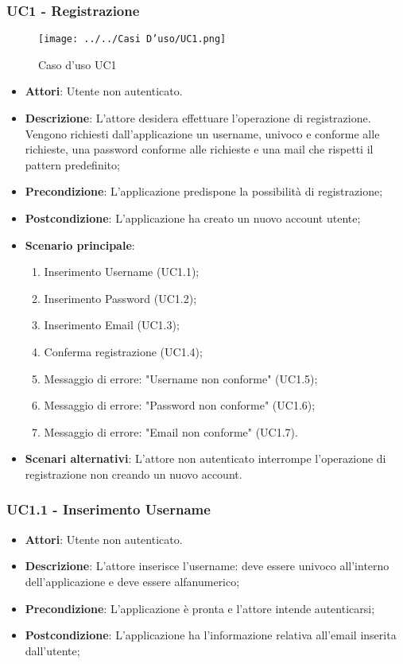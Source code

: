 \subsubsection{UC1 - Registrazione} 
\label{sssec:UC1} 
\begin{figure}[h!] 
\centering 
\texttt{[image: ../../Casi D'uso/UC1.png]} 
\caption{Caso d'uso UC1} 
 \end{figure} 
\begin{itemize} 
\item \textbf{Attori}: Utente non autenticato.
\item \textbf{Descrizione}: L'attore desidera effettuare l'operazione di registrazione. Vengono richiesti dall'applicazione un username, univoco e conforme alle richieste, una password conforme alle richieste e una mail che rispetti il pattern predefinito;
\item \textbf{Precondizione}: L'applicazione predispone la possibilità di registrazione;
\item \textbf{Postcondizione}: L'applicazione ha creato un nuovo account utente;
\item \textbf{Scenario principale}: \begin{enumerate}\item Inserimento Username (UC1.1);\item Inserimento Password (UC1.2);\item Inserimento Email (UC1.3);\item Conferma registrazione (UC1.4);\item Messaggio di errore: "Username non conforme" (UC1.5);\item Messaggio di errore: "Password non conforme" (UC1.6);\item Messaggio di errore: "Email non conforme" (UC1.7). 
 \end{enumerate}
\item \textbf{Scenari alternativi}: L’attore non autenticato interrompe l’operazione di registrazione non creando un nuovo account.
\end{itemize} 
\subsubsection{UC1.1 - Inserimento Username} 
\label{sssec:UC1.1} 
\begin{itemize} 
\item \textbf{Attori}: Utente non autenticato.
\item \textbf{Descrizione}: L’attore inserisce l'username: deve essere univoco all'interno dell'applicazione e deve essere alfanumerico;
\item \textbf{Precondizione}: L'applicazione è pronta e l'attore intende autenticarsi;
\item \textbf{Postcondizione}: L'applicazione ha l’informazione relativa all'email inserita dall’utente;
\end{itemize} 
